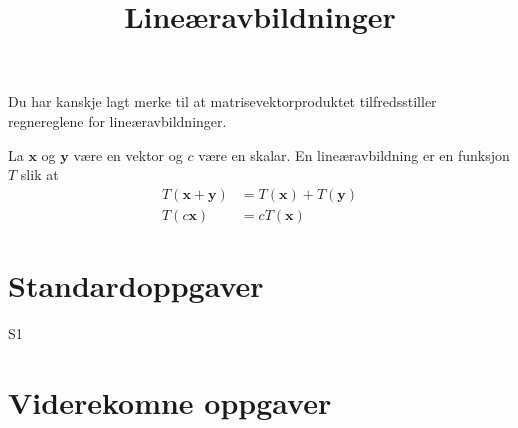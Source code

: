 \documentclass[a4paper,norsk,11pt]{interaktiv}
\title{Lineæravbildninger}
\begin{document}

\maketitle


\begin{tcolorbox}
\end{tcolorbox}

Du har kanskje lagt merke til at matrisevektorproduktet tilfredsstiller regnereglene for lineæravbildninger.

\begin{tcolorbox}[colback=blue!10, title=Superposisjonsprinsippet på matematikermåten]
La $\mathbf{ x}$ og $\mathbf{ y}$ være en vektor og $c$ være en skalar.
En lineæravbildning er en funksjon $T$ slik at 
\begin{align*}
T(\mathbf x+\mathbf y)&=T(\mathbf x)+T(\mathbf y) \\
T(c\mathbf x)&=cT(\mathbf x)
\end{align*}
\end{tcolorbox}


\section*{Standardoppgaver}


\begin{oppgave}{S1}
\end{oppgave}

\section*{Viderekomne oppgaver}
\end{document}
